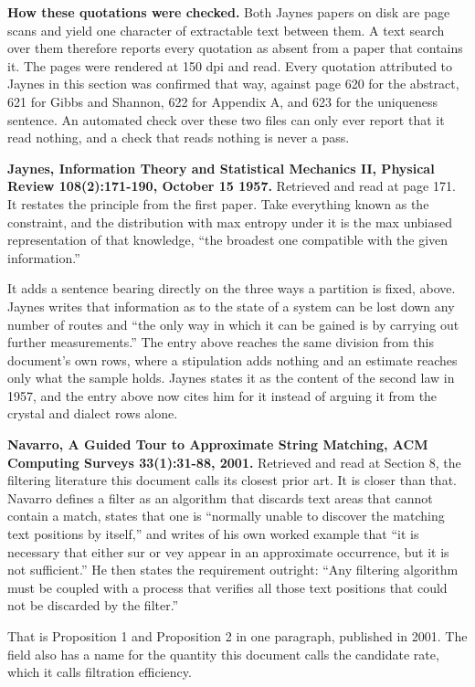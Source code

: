 \textbf{How these quotations were checked.} Both Jaynes papers on disk are page scans and yield one character of extractable text between them. A text search over them therefore reports every quotation as absent from a paper that contains it. The pages were rendered at 150 dpi and read. Every quotation attributed to Jaynes in this section was confirmed that way, against page 620 for the abstract, 621 for Gibbs and Shannon, 622 for Appendix A, and 623 for the uniqueness sentence. An automated check over these two files can only ever report that it read nothing, and a check that reads nothing is never a pass.

\textbf{Jaynes, Information Theory and Statistical Mechanics II, Physical Review 108(2):171-190, October 15 1957.} Retrieved and read at page 171. It restates the principle from the first paper. Take everything known as the constraint, and the distribution with max entropy under it is the max unbiased representation of that knowledge, ``the broadest one compatible with the given information.''

It adds a sentence bearing directly on the three ways a partition is fixed, above. Jaynes writes that information as to the state of a system can be lost down any number of routes and ``the only way in which it can be gained is by carrying out further measurements.'' The entry above reaches the same division from this document's own rows, where a stipulation adds nothing and an estimate reaches only what the sample holds. Jaynes states it as the content of the second law in 1957, and the entry above now cites him for it instead of arguing it from the crystal and dialect rows alone.

\textbf{Navarro, A Guided Tour to Approximate String Matching, ACM Computing Surveys 33(1):31-88, 2001.} Retrieved and read at Section 8, the filtering literature this document calls its closest prior art. It is closer than that. Navarro defines a filter as an algorithm that discards text areas that cannot contain a match, states that one is ``normally unable to discover the matching text positions by itself,'' and writes of his own worked example that ``it is necessary that either sur or vey appear in an approximate occurrence, but it is not sufficient.'' He then states the requirement outright: ``Any filtering algorithm must be coupled with a process that verifies all those text positions that could not be discarded by the filter.''

That is Proposition 1 and Proposition 2 in one paragraph, published in 2001. The field also has a name for the quantity this document calls the candidate rate, which it calls filtration efficiency.

